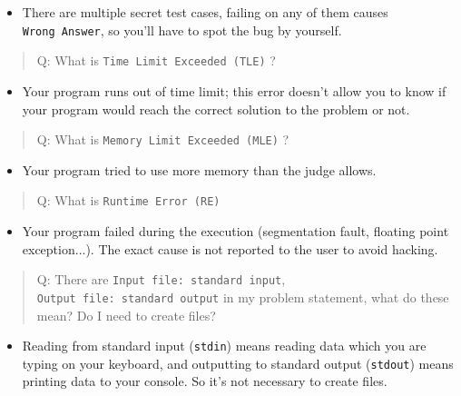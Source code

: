 \documentclass[
]{article}
\begin{document}
\begin{itemize}
\item
  There are multiple secret test cases, failing on any of them causes
  \texttt{Wrong\ Answer}, so you'll have to spot the bug by yourself.
\end{itemize}


\begin{quote}
Q: What is \texttt{Time\ Limit\ Exceeded\ (TLE)} ?
\end{quote}

\begin{itemize}
\item
  Your program runs out of time limit; this error doesn't allow you to
  know if your program would reach the correct solution to the problem
  or not.
\end{itemize}


\begin{quote}
  Q: What is \texttt{Memory\ Limit\ Exceeded\ (MLE)} ?
\end{quote}

\begin{itemize}
\item
  Your program tried to use more memory than the judge allows. 
\end{itemize}

\begin{quote}
  Q: What is \texttt{Runtime\ Error\ (RE)}
\end{quote}

\begin{itemize}
\item
  Your program failed during the execution (segmentation fault, floating
  point exception...). The exact cause is not reported to the user to
  avoid hacking. 
\end{itemize}

\begin{quote}
  Q: There are \texttt{Input\ file:\ standard\ input},
\texttt{Output\ file:\ standard\ output} in my problem statement, what
do these mean? Do I need to create files?
\end{quote}

\begin{itemize}
\item
  Reading from standard input (\texttt{stdin}) means reading data which
  you are typing on your keyboard, and outputting to standard output
  (\texttt{stdout}) means printing data to your console. So it's not
  necessary to create files.
\end{itemize}
\end{document}
